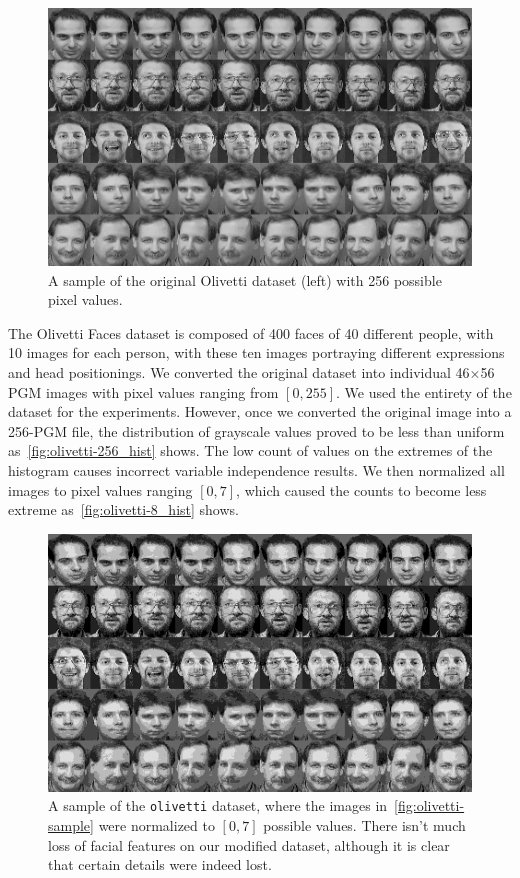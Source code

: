 \documentclass{amsart}
\theoremstyle{plain}
\numberwithin{equation}{section}
\newcommand{\code}[1]{\lstinline[mathescape=true]{#1}}
\begin{document}
\begin{figure}[h]
  \centering\includegraphics[scale=0.75]{imgs/olivetti_sample.png}
  \caption{A sample of the original Olivetti dataset (left) with 256 possible pixel
  values.}\label{fig:olivetti-sample}
\end{figure}

The Olivetti Faces dataset is composed of 400 faces of 40 different people, with 10 images for each
person, with these ten images portraying different expressions and head positionings. We converted
the original dataset into individual 46$\times$56 PGM images with pixel values ranging from $[0,
255]$. We used the entirety of the dataset for the experiments. However, once we converted the
original image into a 256-PGM file, the distribution of grayscale values proved to be less than
uniform as~\autoref{fig:olivetti-256_hist} shows. The low count of values on the extremes of the
histogram causes incorrect variable independence results. We then normalized all images to pixel
values ranging $[0,7]$, which caused the counts to become less extreme
as~\autoref{fig:olivetti-8_hist} shows.

\begin{figure}[h]
  \centering\includegraphics[scale=0.75]{imgs/olivetti-8_sample.png}
  \captionsetup{singlelinecheck=false,justification=justified,margin=0cm}
  \caption{A sample of the \code{olivetti} dataset, where the images
  in~\autoref{fig:olivetti-sample} were normalized to $[0,7]$ possible values. There isn't much
  loss of facial features on our modified dataset, although it is clear that certain details were
  indeed lost.}
\end{figure}
\end{document}
